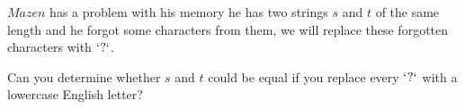 $Mazen$ has a problem with his memory he has two strings $s$ and $t$ of the same length and he forgot some characters from them, we will replace these forgotten characters with $\bf{`?`}$.

Can you determine whether $s$ and $t$ could be equal if you replace every $\bf{`?`}$ with a lowercase English letter?